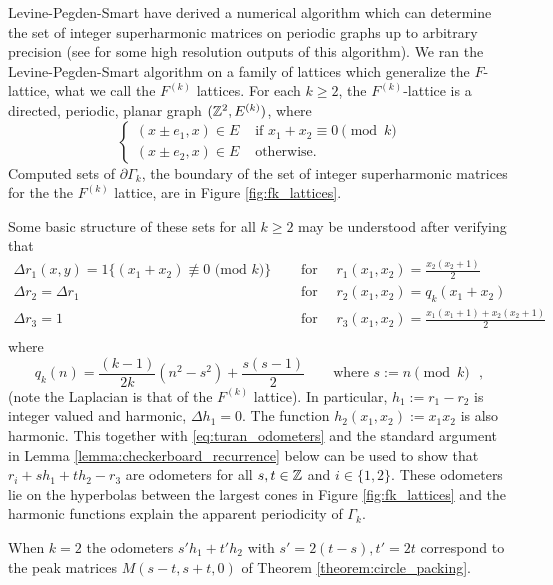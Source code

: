 \documentclass[12pt]{amsart}
\begin{document}
Levine-Pegden-Smart have derived a numerical algorithm which can determine the set of integer superharmonic matrices on periodic graphs up to arbitrary precision \cite{levine2016apollonian} (see \cite{pegdensandpile} for some high resolution outputs of this algorithm). 
We ran the Levine-Pegden-Smart algorithm on a family of lattices which generalize the $F$-lattice, what we call the $F^{(k)}$ lattices.
For each $k \geq 2$, the $F^{(k)}$-lattice is a directed, periodic, planar graph $(\mathbb{Z}^2, E^{(k)})$, where
\[
\begin{cases}
(x \pm e_1,x) \in E &\mbox{ if $x_1 + x_2  \equiv 0 \pmod k$} \\
(x \pm e_2,x) \in E &\mbox{ otherwise. }
\end{cases}
\]
Computed sets of $\partial \Gamma_k$, the boundary of the set of integer superharmonic matrices for the the $F^{(k)}$ lattice, are in Figure \ref{fig:fk_lattices}. 


Some basic structure of these sets for all $k \geq 2$ may be understood after verifying that
\begin{equation} \label{eq:turan_odometers}
\begin{aligned}
 \Delta r_1(x,y) = 1\{(x_1+x_2) \not \equiv 0 \mbox{ (mod $k$)} \} &\quad \mbox{ for } \quad  r_1(x_1,x_2) = \frac{x_2(x_2+1)}{2} \\
\Delta r_2 = \Delta r_1 &\quad \mbox{ for } \quad  r_2(x_1,x_2) =  q_k(x_1+x_2) \\
\Delta r_3 = 1  &\quad \mbox{ for } \quad  r_3(x_1,x_2) = \frac{x_1(x_1+1) + x_2 (x_2+1)}{2} \\
\end{aligned}
\end{equation}
where
\[
q_k(n) = \frac{(k-1)}{2 k} (n^2 - s^2) + \frac{ s (s-1)}{2} \qquad \mbox{where $s := n \pmod k$ },
\]
(note the Laplacian is that of the $F^{(k)}$ lattice). In particular, $h_1 := r_1 - r_2$ is integer valued and harmonic, $\Delta h_1 = 0$. 
The function $h_2(x_1,x_2) := x_1 x_2$ is also harmonic.  This together with \eqref{eq:turan_odometers} and the standard argument in
Lemma \ref{lemma:checkerboard_recurrence} below can be used to show that $r_i + s h_1 + t h_2 - r_3$ are odometers for all $s, t \in \mathbb{Z}$ and $i \in \{1,2\}$. 
These odometers lie on the hyperbolas between the largest cones in Figure \ref{fig:fk_lattices} and the harmonic functions explain the apparent 
periodicity of $\Gamma_k$. 

When $k=2$ the odometers $s'h_1 + t' h_2$ with $s' = 2(t-s), t' = 2t$ correspond to the peak matrices $M(s-t,s+t,0)$ of Theorem \ref{theorem:circle_packing}.
\end{document}
